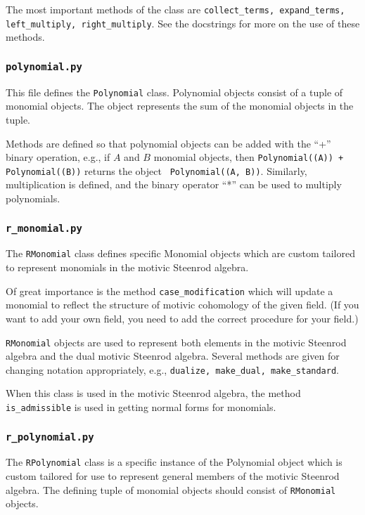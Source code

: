 \documentclass{article}
\begin{document}
The most important methods of the class are {\tt collect\_terms,
  expand\_terms, left\_multiply, right\_multiply}. See the docstrings
for more on the use of these methods.

\subsubsection{\tt polynomial.py}
This file defines the \texttt{Polynomial} class. Polynomial objects
consist of a tuple of monomial objects. The object represents the sum
of the monomial objects in the tuple.

Methods are defined so that polynomial objects can be added with the
``+'' binary operation, e.g., if $A$ and $B$ monomial objects, then
{\tt Polynomial((A)) + Polynomial((B))} returns the object {\tt
  Polynomial((A, B))}. Similarly, multiplication is defined, and the
binary operator ``*'' can be used to multiply polynomials.

\subsubsection{ {\tt r\_monomial.py}}
The {\tt RMonomial} class defines specific Monomial objects which are
custom tailored to represent monomials in the motivic Steenrod
algebra. 

Of great importance is the method {\tt case\_modification} which will
update a monomial to reflect the structure of motivic cohomology of
the given field. (If you want to add your own field, you need to add
the correct procedure for your field.)

{\tt RMonomial} objects are used to represent both elements in the
motivic Steenrod algebra and the dual motivic Steenrod
algebra. Several methods are given for changing notation
appropriately, e.g., {\tt dualize, make\_dual, make\_standard}.

When this class is used in the motivic Steenrod algebra, the method
{\tt is\_admissible} is used in getting normal forms for monomials.

\subsubsection{ {\tt r\_polynomial.py}}
The {\tt RPolynomial} class is a specific instance of the Polynomial
object which is custom tailored for use to represent general members
of the motivic Steenrod algebra. The defining tuple of monomial
objects should consist of {\tt RMonomial} objects.
\end{document}
